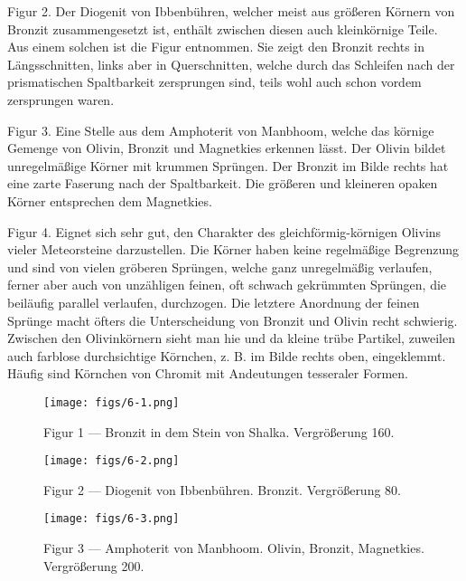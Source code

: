 \documentclass[a4paper, 11pt, oneside, polutonikogreek, german]{article}
\begin{document}
Figur 2. Der Diogenit von Ibbenbühren, welcher meist aus größeren Körnern von Bronzit zusammengesetzt ist, enthält zwischen diesen auch kleinkörnige Teile. Aus einem solchen ist die Figur entnommen. Sie zeigt den Bronzit rechts in Längsschnitten, links aber in Querschnitten, welche durch das Schleifen nach der prismatischen Spaltbarkeit zersprungen sind, teils wohl auch schon vordem zersprungen waren.

Figur 3. Eine Stelle aus dem Amphoterit von Manbhoom, welche das körnige Gemenge von Olivin, Bronzit und Magnetkies erkennen lässt. Der Olivin bildet unregelmäßige Körner mit krummen Sprüngen. Der Bronzit im Bilde rechts hat eine zarte Faserung nach der Spaltbarkeit. Die größeren und kleineren opaken Körner entsprechen dem Magnetkies.

Figur 4. Eignet sich sehr gut, den Charakter des gleichförmig-körnigen Olivins vieler Meteorsteine darzustellen. Die Körner haben keine regelmäßige Begrenzung und sind von vielen gröberen Sprüngen, welche ganz unregelmäßig verlaufen, ferner aber auch von unzähligen feinen, oft schwach gekrümmten Sprüngen, die beiläufig parallel verlaufen, durchzogen. Die letztere Anordnung der feinen Sprünge macht öfters die Unterscheidung von Bronzit und Olivin recht schwierig. Zwischen den Olivinkörnern sieht man hie und da kleine trübe Partikel, zuweilen auch farblose durchsichtige Körnchen, z. B. im Bilde rechts oben, eingeklemmt. Häufig sind Körnchen von Chromit mit Andeutungen tesseraler Formen.
\clearpage

\vspace*{\fill}
\begin{figure}[H]
\centering
\texttt{[image: figs/6-1.png]}
\caption{\small Figur 1 --- Bronzit in dem Stein von Shalka. Vergrößerung 160.}
\end{figure}
\vspace*{\fill}
\clearpage

\vspace*{\fill}
\begin{figure}[H]
\centering
\texttt{[image: figs/6-2.png]}
\caption{\small Figur 2 --- Diogenit von Ibbenbühren. Bronzit. Vergrößerung 80.}
\end{figure}
\vspace*{\fill}
\clearpage

\vspace*{\fill}
\begin{figure}[H]
\centering
\texttt{[image: figs/6-3.png]}
\caption{\small Figur 3 --- Amphoterit von Manbhoom. Olivin, Bronzit, Magnetkies. Vergrößerung 200.}
\end{figure}
\vspace*{\fill}
\clearpage
\end{document}
